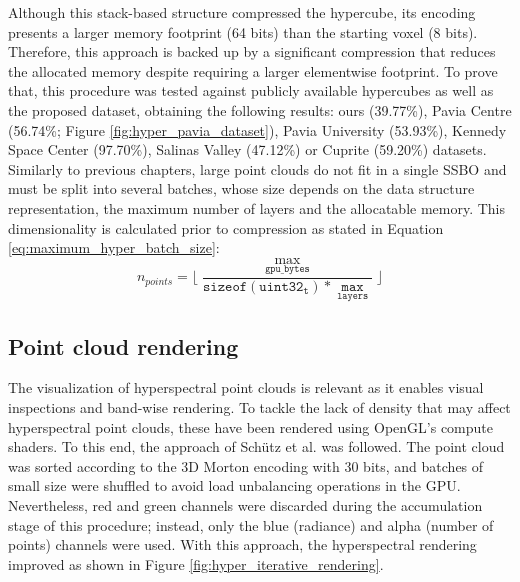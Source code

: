 Although this stack-based structure compressed the hypercube, its encoding presents a larger memory footprint (64 bits) than the starting voxel (8 bits). Therefore, this approach is backed up by a significant compression that reduces the allocated memory despite requiring a larger elementwise footprint. To prove that, this procedure was tested against publicly available hypercubes \cite{noauthor_hyperspectral_nodate} as well as the proposed dataset, obtaining the following results: ours (39.77\%), Pavia Centre (56.74\%; Figure \ref{fig:hyper_pavia_dataset}), Pavia University (53.93\%), Kennedy Space Center (97.70\%), Salinas Valley (47.12\%) or Cuprite (59.20\%) datasets. Similarly to previous chapters, large point clouds do not fit in a single SSBO and must be split into several batches, whose size depends on the data structure representation, the maximum number of layers and the allocatable memory. This dimensionality is calculated prior to compression as stated in Equation \ref{eq:maximum_hyper_batch_size}:
\begin{equation}
    n_{\textit{points}} = \lfloor{\frac{\max_{\mathtt{gpu\_bytes}}}{\mathtt{sizeof(uint32_t)} * \mathtt{\max_{\mathtt{layers}}}}\rfloor}
    \label{eq:maximum_hyper_batch_size}
\end{equation}

\subsection{Point cloud rendering}

The visualization of hyperspectral point clouds is relevant as it enables visual inspections and band-wise rendering. To tackle the lack of density that may affect hyperspectral point clouds, these have been rendered using OpenGL's compute shaders. To this end, the approach of Schütz et al. \cite{schutz_rendering_2021} was followed. The point cloud was sorted according to the 3D Morton encoding with 30 bits, and batches of small size were shuffled to avoid load unbalancing operations in the GPU. Nevertheless, red and green channels were discarded during the accumulation stage of this procedure; instead, only the blue (radiance) and alpha (number of points) channels were used. With this approach, the hyperspectral rendering improved as shown in Figure \ref{fig:hyper_iterative_rendering}.


